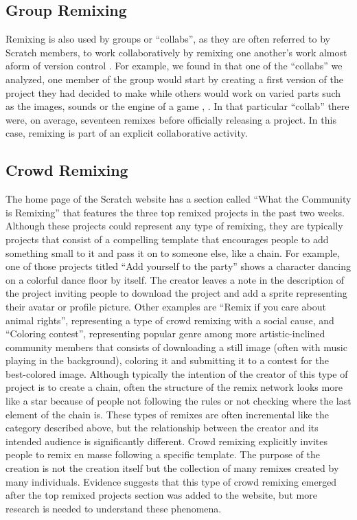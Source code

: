 \subsection{Group Remixing}
Remixing is also used by groups or ``collabs'', as they are often referred to by Scratch members, to work collaboratively by remixing one another's work almost aform of version control \citep{tichy_rcs_1985}.
For example, we found in that one of the ``collabs'' we analyzed, one member of the group would start by creating a first version of the project they had decided to make while others would work on varied parts such as the images, sounds or the engine of a game \citep{aragon_tale_2009}, .
In that particular ``collab'' there were, on average, seventeen remixes before officially releasing a project.
In this case, remixing is part of an explicit collaborative activity.


\subsection{Crowd Remixing}
The home page of the Scratch website has a section called ``What the Community is Remixing''  that features the three top remixed projects in the past two weeks.
Although these projects could represent any type of remixing, they are typically projects that consist of a compelling template that encourages people to add something small to it and pass it on to someone else, like a chain.
For example, one of those projects titled ``Add yourself to the party'' shows a character dancing on a colorful dance floor by itself.
The creator leaves a note in the description of the project inviting people to download the project and add a sprite representing their avatar or profile picture.
Other examples are ``Remix if you care about animal rights'', representing a type of crowd remixing with a social cause, and ``Coloring contest'', representing popular genre among more artistic-inclined community members that consists of downloading a still image (often with music playing in the background), coloring it and submitting it to a contest for the best-colored image.
Although typically the intention of the creator of this type of project is to create a chain, often the structure of the remix network looks more like a star because of people not following the rules or not checking where the last element of the chain is.
These types of remixes are often incremental like the category described above, but the relationship between the creator and its intended audience is significantly different. 
Crowd remixing explicitly invites people to remix en masse following a specific template. 
The purpose of the creation is not the creation itself but the collection of many remixes created by many individuals.
Evidence suggests that this type of crowd remixing emerged after the top remixed projects section was added to the website, but more research is needed to understand these phenomena.

